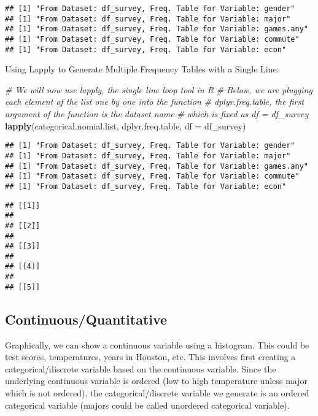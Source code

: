 \documentclass[
]{book}
\newenvironment{Shaded}{\begin{snugshade}}{\end{snugshade}}
\newcommand{\CommentTok}[1]{\textcolor[rgb]{0.56,0.35,0.01}{\textit{#1}}}
\newcommand{\DataTypeTok}[1]{\textcolor[rgb]{0.13,0.29,0.53}{#1}}
\newcommand{\KeywordTok}[1]{\textcolor[rgb]{0.13,0.29,0.53}{\textbf{#1}}}
\newcommand{\NormalTok}[1]{#1}
\begin{document}
\begin{verbatim}
## [1] "From Dataset: df_survey, Freq. Table for Variable: gender"
## [1] "From Dataset: df_survey, Freq. Table for Variable: major"
## [1] "From Dataset: df_survey, Freq. Table for Variable: games.any"
## [1] "From Dataset: df_survey, Freq. Table for Variable: commute"
## [1] "From Dataset: df_survey, Freq. Table for Variable: econ"
\end{verbatim}

Using Lapply to Generate Multiple Frequency Tables with a Single Line:

\begin{Shaded}
\begin{Highlighting}[]
\CommentTok{\# We will now use lapply, the single line loop tool in R}
\CommentTok{\# Below, we are plugging each element of the list one by one into the function}
\CommentTok{\# dplyr.freq.table, the first argument of the function is the dataset name}
\CommentTok{\# which is fixed as df = df\_survey}
\KeywordTok{lapply}\NormalTok{(categorical.nomial.list,}
\NormalTok{       dplyr.freq.table,}
       \DataTypeTok{df =}\NormalTok{ df\_survey)}
\end{Highlighting}
\end{Shaded}

\begin{verbatim}
## [1] "From Dataset: df_survey, Freq. Table for Variable: gender"
## [1] "From Dataset: df_survey, Freq. Table for Variable: major"
## [1] "From Dataset: df_survey, Freq. Table for Variable: games.any"
## [1] "From Dataset: df_survey, Freq. Table for Variable: commute"
## [1] "From Dataset: df_survey, Freq. Table for Variable: econ"
\end{verbatim}

\begin{verbatim}
## [[1]]
## 
## [[2]]
## 
## [[3]]
## 
## [[4]]
## 
## [[5]]
\end{verbatim}

\hypertarget{continuousquantitative}{%
\subsection{Continuous/Quantitative}\label{continuousquantitative}}

Graphically, we can show a continuous variable using a histogram. This could be test scores, temperatures, years in Houston, etc. This involves first creating a categorical/discrete variable based on the continuous variable. Since the underlying continuous variable is ordered (low to high temperature unless major which is not ordered), the categorical/discrete variable we generate is an ordered categorical variable (majors could be called unordered categorical variable).
\end{document}
